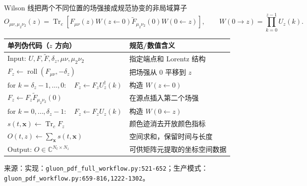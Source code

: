 \documentclass[UTF8,aspectratio=169,11pt]{ctexbeamer}
\newcommand{\source}[1]{%
  \vspace{0.06em}\par{\raggedright\scriptsize\color{muted}来源：#1\par}}
\newcommand{\codepath}[1]{\nolinkurl{#1}}
\begin{document}
\begin{frame}[t]{Wilson 线把两个不同位置的场强接成规范协变的非局域算子}
  \begin{equation*}
    O_{\mu\nu,\mu_2\nu_2}(z)=
    \operatorname{Tr}_c\!\left[
      F_{\mu\nu}(z)W(z\leftarrow0)
      \widetilde F_{\mu_2\nu_2}(0)W(0\leftarrow z)
    \right],
    \qquad
    W(0\to z)=\prod_{k=0}^{z-1}U_z(k).
  \end{equation*}
  \begin{center}
    \small
    \begin{tabularx}{0.94\textwidth}{@{}lY@{}}
      \toprule
      单列伪代码（\(z\) 方向） & 规范/数值含义 \\
      \midrule
      \(\text{Input: }U,F,\widetilde F,\delta_z,\mu\nu,\mu_2\nu_2\) & 指定端点和 Lorentz 结构 \\
      \(F_z\gets\operatorname{roll}(F_{\mu\nu},-\delta_z)\) & 把场强从 0 平移到 \(z\) \\
      \(\text{for }k=\delta_z-1,\ldots,0:\quad F_z\gets F_zU_z^\dagger(k)\) & 构造 \(W(z\leftarrow0)\) \\
      \(F_z\gets F_z\widetilde F_{\mu_2\nu_2}(0)\) & 在源点插入第二个场强 \\
      \(\text{for }k=0,\ldots,\delta_z-1:\quad F_z\gets F_zU_z(k)\) & 构造 \(W(0\leftarrow z)\) \\
      \(s(t,\mathbf x)\gets\operatorname{Tr}_c F_z\) & 颜色迹消去开放颜色指标 \\
      \(O(t,z)\gets\sum_{\mathbf x}s(t,\mathbf x)\) & 空间求和，保留时间与长度 \\
      \(\text{Output: }O\in\mathbb C^{N_t\times N_z}\) & 可供矩阵元提取的坐标空间数据 \\
      \bottomrule
    \end{tabularx}
  \end{center}
  \source{实现：\codepath{gluon_pdf_full_workflow.py:521-652}；生产模式：\codepath{gluon_pdf_workflow.py:659-816,1222-1302}。}
\end{frame}
\end{document}
